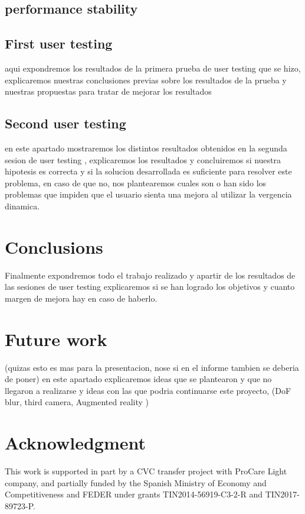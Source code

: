 \documentclass[10pt,a4paper,twocolumn,twoside]{article}
\begin{document}
	\subsection{performance stability}

	
	
	\subsection{First user testing}
	aqui expondremos los resultados de la primera prueba de user testing que se hizo, explicaremos nuestras conclusiones previas sobre los resultados de la prueba y nuestras propuestas para tratar de mejorar los resultados
	
	\subsection{Second user testing}
	en este apartado mostraremos los distintos resultados obtenidos en la segunda sesion de user testing , explicaremos los resultados y concluiremos si nuestra hipotesis es correcta y si la solucion desarrollada es suficiente para resolver este problema, en caso de que no, nos plantearemos cuales son o han sido los problemas que impiden que el usuario sienta una mejora al utilizar la vergencia dinamica.
	
	\section{Conclusions}
	Finalmente expondremos todo el trabajo realizado y apartir de los resultados de las sesiones de user testing explicaremos si se han logrado los objetivos y cuanto margen de mejora hay en caso de haberlo. 
	
	\section{Future work}
	(quizas esto es mas para la presentacion, nose si en el informe tambien se deberia de poner)
	en este apartado explicaremos ideas que se plantearon y que no llegaron a realizarse y ideas con las que podria continuarse este proyecto, (DoF blur, third camera, Augmented reality )
	
	\section*{Acknowledgment}
	This work is supported in part by a CVC transfer project with ProCare Light company, and partially funded by the Spanish Ministry of Economy and Competitiveness and FEDER under grants TIN2014-56919-C3-2-R and TIN2017-89723-P.
	
\end{document}
